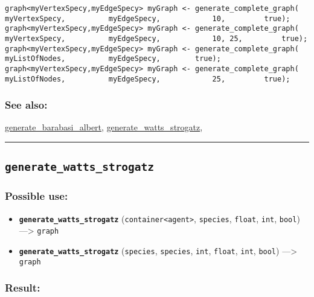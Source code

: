 \documentclass[]{book}
\providecommand{\tightlist}{%
  \setlength{\itemsep}{0pt}\setlength{\parskip}{0pt}}
\theoremstyle{definition}
\theoremstyle{definition}
\theoremstyle{definition}
\theoremstyle{remark}
\begin{document}
\begin{verbatim}
graph<myVertexSpecy,myEdgeSpecy> myGraph <- generate_complete_graph(            myVertexSpecy,          myEdgeSpecy,            10,         true); graph<myVertexSpecy,myEdgeSpecy> myGraph <- generate_complete_graph(             myVertexSpecy,          myEdgeSpecy,            10, 25,         true); graph<myVertexSpecy,myEdgeSpecy> myGraph <- generate_complete_graph(             myListOfNodes,          myEdgeSpecy,        true); graph<myVertexSpecy,myEdgeSpecy> myGraph <- generate_complete_graph(             myListOfNodes,          myEdgeSpecy,            25,         true); 
\end{verbatim}

\subsubsection{See also:}\label{see-also-104}

\href{OperatorsDH\#generate_barabasi_albert}{generate\_barabasi\_albert},
\href{OperatorsDH\#generate_watts_strogatz}{generate\_watts\_strogatz},

\begin{center}\rule{0.5\linewidth}{\linethickness}\end{center}

\subsection{\texorpdfstring{\texttt{generate\_watts\_strogatz}}{generate\_watts\_strogatz}}\label{generate_watts_strogatz}

\subsubsection{Possible use:}\label{possible-use-188}

\begin{itemize}
\tightlist
\item
  \textbf{\texttt{generate\_watts\_strogatz}}
  (\texttt{container\textless{}agent\textgreater{}}, \texttt{species},
  \texttt{float}, \texttt{int}, \texttt{bool}) ---\textgreater{}
  \texttt{graph}
\item
  \textbf{\texttt{generate\_watts\_strogatz}} (\texttt{species},
  \texttt{species}, \texttt{int}, \texttt{float}, \texttt{int},
  \texttt{bool}) ---\textgreater{} \texttt{graph}
\end{itemize}

\subsubsection{Result:}\label{result-182}
\end{document}
